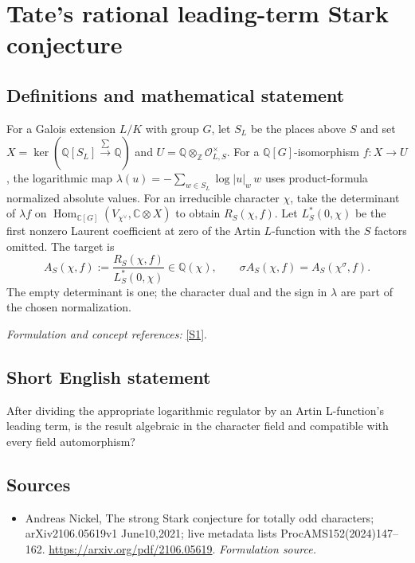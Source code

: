 \documentclass[11pt]{article}
\begin{document}
\section*{\texorpdfstring{Tate's rational leading-term Stark conjecture}{Tate's rational leading-term Stark conjecture}}\label{statement}
\subsection{Definitions and mathematical statement}
For a Galois extension $L/K$ with group $G$, let $S_L$ be the places above $S$ and set
$X=\ker({\mathbb{Q}}[S_L]\xrightarrow{\sum}{\mathbb{Q}})$ and
$U={\mathbb{Q}}\otimes_{{\mathbb{Z}}}\mathcal O_{L,S}^{\times}$. For a ${\mathbb{Q}}[G]$-isomorphism $f:X\to U$, the logarithmic map
$\lambda(u)=-\sum_{w\in S_L}\log|u|_w\,w$
uses product-formula normalized absolute values. For an irreducible character $\chi$, take the determinant of $\lambda f$ on
$\operatorname{Hom}_{{\mathbb{C}}[G]}(V_{\chi^\vee},{\mathbb{C}}\otimes X)$ to obtain $R_S(\chi,f)$. Let $L_S^*(0,\chi)$ be the first nonzero Laurent coefficient at zero of the Artin $L$-function with the $S$ factors omitted. The target is
\[
 A_S(\chi,f):=\frac{R_S(\chi,f)}{L_S^*(0,\chi)}\in{\mathbb{Q}}(\chi),
 \qquad\sigma A_S(\chi,f)=A_S(\chi^\sigma,f).
\]
The empty determinant is one; the character dual and the sign in $\lambda$ are part of the chosen normalization.
\par\smallskip\textit{Formulation and concept references:} \href{https://arxiv.org/pdf/2106.05619}{[S1]}.

\subsection{Short English statement}
After dividing the appropriate logarithmic regulator by an Artin L-function's leading term, is the result algebraic in the character field and compatible with every field automorphism?
\subsection{Sources}
\begin{itemize}
\item[S1]Andreas Nickel, The strong Stark conjecture for totally odd characters; arXiv2106.05619v1 June10,2021; live metadata lists ProcAMS152(2024)147–162.
\url{https://arxiv.org/pdf/2106.05619}.
\textit{Formulation source.}
\end{itemize}
\end{document}
